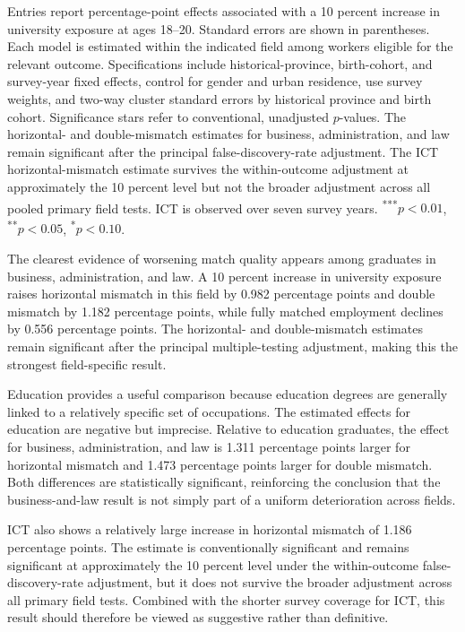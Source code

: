 \begin{table}[htbp]
\begin{threeparttable}
\begin{tablenotes}[flushleft]
    \item Entries report percentage-point effects associated with a 10 percent increase in university exposure at ages 18--20. Standard errors are shown in parentheses. Each model is estimated within the indicated field among workers eligible for the relevant outcome. Specifications include historical-province, birth-cohort, and survey-year fixed effects, control for gender and urban residence, use survey weights, and two-way cluster standard errors by historical province and birth cohort. Significance stars refer to conventional, unadjusted $p$-values. The horizontal- and double-mismatch estimates for business, administration, and law remain significant after the principal false-discovery-rate adjustment. The ICT horizontal-mismatch estimate survives the within-outcome adjustment at approximately the 10 percent level but not the broader adjustment across all pooled primary field tests. ICT is observed over seven survey years. \textsuperscript{***}$p<0.01$, \textsuperscript{**}$p<0.05$, \textsuperscript{*}$p<0.10$.
  \end{tablenotes}
  \end{threeparttable}
\end{table}

The clearest evidence of worsening match quality appears among graduates in business, administration, and law. A 10 percent increase in university exposure raises horizontal mismatch in this field by 0.982 percentage points and double mismatch by 1.182 percentage points, while fully matched employment declines by 0.556 percentage points. The horizontal- and double-mismatch estimates remain significant after the principal multiple-testing adjustment, making this the strongest field-specific result.

Education provides a useful comparison because education degrees are generally linked to a relatively specific set of occupations. The estimated effects for education are negative but imprecise. Relative to education graduates, the effect for business, administration, and law is 1.311 percentage points larger for horizontal mismatch and 1.473 percentage points larger for double mismatch. Both differences are statistically significant, reinforcing the conclusion that the business-and-law result is not simply part of a uniform deterioration across fields.

ICT also shows a relatively large increase in horizontal mismatch of 1.186 percentage points. The estimate is conventionally significant and remains significant at approximately the 10 percent level under the within-outcome false-discovery-rate adjustment, but it does not survive the broader adjustment across all primary field tests. Combined with the shorter survey coverage for ICT, this result should therefore be viewed as suggestive rather than definitive.

